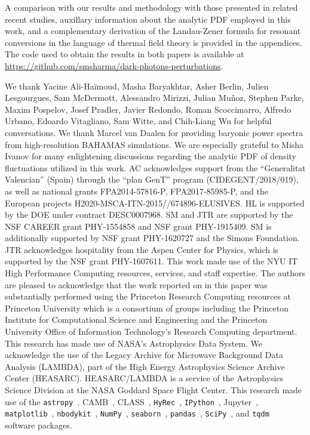 \documentclass[prd,aps,10pt,nofootinbib,twocolumn,superscriptaddress,preprintnumbers,balancelastpage,longbibliography]{revtex4-1}
\begin{document}
A comparison with our results and methodology with those presented in related recent studies, auxillary information about the analytic PDF employed in this work, and a complementary derivation of the Landau-Zener formula for resonant conversions in the language of thermal field theory is provided in the appendices. The code used to obtain the results in both papers is available at \url{https://github.com/smsharma/dark-photons-perturbations}.

\vspace{.3cm}

\begin{acknowledgments}

We thank Yacine Ali-Ha\"{i}moud, Masha Baryakhtar, Asher Berlin, Julien Lesgourgues, Sam McDermott, Alessandro Mirizzi, Julian Mu\~{n}oz, Stephen Parke, Maxim Pospelov, Josef Pradler, Javier Redondo, Roman Scoccimarro, Alfredo Urbano, Edoardo Vitagliano, Sam Witte, and Chih-Liang Wu for helpful conversations. We thank Marcel van Daalen for providing baryonic power spectra from high-resolution BAHAMAS simulations. We are especially grateful to Misha Ivanov for many enlightening discussions regarding the analytic PDF of density fluctuations utilized in this work. AC acknowledges support from the ``Generalitat Valencian'' (Spain) through the ``plan GenT'' program (CIDEGENT/2018/019), as well as national grants FPA2014-57816-P, FPA2017-85985-P, and the European projects H2020-MSCA-ITN-2015//674896-ELUSIVES. HL is supported by the DOE under contract DESC0007968. SM and JTR are supported by the NSF CAREER grant PHY-1554858 and NSF grant PHY-1915409. SM is additionally supported by NSF grant PHY-1620727 and the Simons Foundation. 
JTR acknowledges hospitality from  the Aspen Center for Physics, which is supported by the NSF grant PHY-1607611.
This work made use of the NYU IT High Performance Computing resources, services, and staff expertise. The authors are pleased to acknowledge that the work reported on in this paper was substantially performed using the Princeton Research Computing resources at Princeton University which is a consortium of groups including the Princeton Institute for Computational Science and Engineering and the Princeton University Office of Information Technology's Research Computing department. This research has made use of NASA's Astrophysics Data System. We acknowledge the use of the Legacy Archive for Microwave Background Data Analysis (LAMBDA), part of the High Energy Astrophysics Science Archive Center (HEASARC). HEASARC/LAMBDA is a service of the Astrophysics Science Division at the NASA Goddard Space Flight Center. This research made use of the \texttt{astropy}~\cite{Price-Whelan:2018hus,Robitaille:2013mpa}, CAMB~\cite{Lewis:1999bs,Lewis:2002ah}, CLASS~\cite{Blas:2011rf}, \texttt{HyRec}~\cite{AliHaimoud:2010dx}, \texttt{IPython}~\cite{PER-GRA:2007}, Jupyter~\cite{Kluyver2016JupyterN}, \texttt{matplotlib}~\cite{Hunter:2007}, \texttt{nbodykit}~\cite{Hand:2017pqn}, \texttt{NumPy}~\cite{numpy:2011}, \texttt{seaborn}~\cite{seaborn}, \texttt{pandas}~\cite{pandas:2010}, \texttt{SciPy}~\cite{2020SciPy-NMeth}, and \texttt{tqdm}~\cite{da2019tqdm}  software packages. 
\end{acknowledgments}
\end{document}
